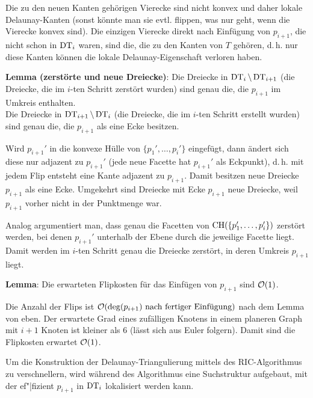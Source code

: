 \begin{Beweis}
    Die zu den neuen Kanten gehörigen Vierecke sind nicht konvex
    und daher lokale Delaunay-Kanten (sonst könnte man sie evtl. flippen, was nur geht, wenn
    die Vierecke konvex sind).
    Die einzigen Vierecke direkt nach Einfügung von $p_{i+1}$, die nicht schon in $\operatorname{DT}_i$ waren,
    sind die, die zu den Kanten von $T$ gehören,
    d.\,h. nur diese Kanten können die lokale Delaunay-Eigenschaft verloren haben.
\end{Beweis}

\textbf{Lemma (zerstörte und neue Dreiecke)}:
Die Dreiecke in $\operatorname{DT}_i \setminus \operatorname{DT}_{i+1}$
(die Dreiecke, die im $i$-ten Schritt zerstört wurden)
sind genau die, die $p_{i+1}$ im Umkreis enthalten.\\
Die Dreiecke in $\operatorname{DT}_{i+1} \setminus \operatorname{DT}_i$
(die Dreiecke, die im $i$-ten Schritt erstellt wurden)
sind genau die, die $p_{i+1}$ als eine Ecke besitzen.

\begin{Beweis}
    Wird $p_{i+1}'$ in die konvexe Hülle von $\{p_1', \dotsc, p_i'\}$ eingefügt,
    dann ändert sich diese nur adjazent zu $p_{i+1}'$
    (jede neue Facette hat $p_{i+1}'$ als Eckpunkt),
    d.\,h. mit jedem Flip entsteht eine Kante adjazent zu $p_{i+1}$.
    Damit besitzen neue Dreiecke $p_{i+1}$ als eine Ecke.
    Umgekehrt sind Dreiecke mit Ecke $p_{i+1}$ neue Dreiecke, weil $p_{i+1}$ vorher nicht in der
    Punktmenge war.
    
    Analog argumentiert man, dass genau die Facetten von $\operatorname{CH}(\{p_1', \dotsc, p_i'\})$
    zerstört werden, bei denen $p_{i+1}'$ unterhalb der Ebene durch die jeweilige Facette liegt.
    Damit werden im $i$-ten Schritt genau die Dreiecke zerstört, in deren Umkreis $p_{i+1}$
    liegt.
\end{Beweis}

\textbf{Lemma}:
Die erwarteten Flipkosten für das Einfügen von $p_{i+1}$ sind $\mathcal{O}(1)$.

\begin{Beweis}
    Die Anzahl der Flips ist $\mathcal{O}(\text{$\deg(p_{i+1})$ nach fertiger Einfügung})$
    nach dem Lemma von eben.
    Der erwartete Grad eines zufälligen Knotens in einem planeren Graph mit $i + 1$ Knoten ist
    kleiner als $6$ (lässt sich aus Euler folgern).
    Damit sind die Flipkosten erwartet $\mathcal{O}(1)$.
\end{Beweis}

\linie
\pagebreak

Um die Konstruktion der Delaunay-Triangulierung mittels des RIC-Algorithmus zu verschnellern,
wird während des Algorithmus eine Suchstruktur aufgebaut, mit der ef"|fizient $p_{i+1}$ in
$\operatorname{DT}_i$ lokalisiert werden kann.

